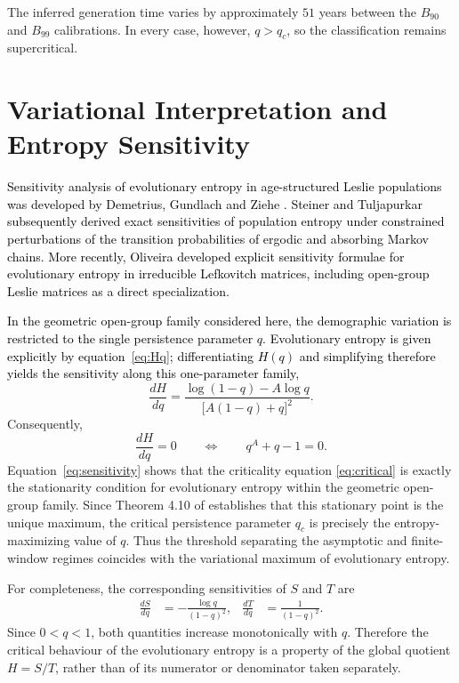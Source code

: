 \documentclass[11pt,a4paper]{amsart}
\begin{document}
The inferred generation time varies by approximately \(51\) years
between the \(B_{90}\) and \(B_{99}\) calibrations. In every case, however,
\(q>q_c\), so the classification remains supercritical.


\section{Variational Interpretation and Entropy Sensitivity}
\label{sec:sensitivity}

\textcolor{black}{Sensitivity analysis of evolutionary entropy in age-structured Leslie
populations was developed by Demetrius, Gundlach and Ziehe
\cite{Demetrius07}. Steiner and Tuljapurkar
\cite{SteinerTuljapurkar2020} subsequently derived exact sensitivities
of population entropy under constrained perturbations of the transition
probabilities of ergodic and absorbing Markov chains. More recently,
Oliveira \cite{Oliveira2026} developed explicit sensitivity
formulae for evolutionary entropy in irreducible Lefkovitch matrices,
including open-group Leslie matrices as a direct specialization.}

\textcolor{black}{In the geometric open-group family considered here, the demographic
variation is restricted to the single persistence parameter \(q\).
Evolutionary entropy is given explicitly by
equation~\eqref{eq:Hq}; differentiating \(H(q)\) and simplifying
therefore yields the sensitivity along this one-parameter family,}
\[
\frac{dH}{dq}
=
\frac{\log(1-q)-A\log q}
     {\bigl[A(1-q)+q\bigr]^2}.
\]
Consequently,
\begin{equation}
\label{eq:sensitivity}
\frac{dH}{dq}=0
\qquad\Longleftrightarrow\qquad
q^A+q-1=0.
\end{equation}
Equation~\eqref{eq:sensitivity} shows that the criticality equation
\eqref{eq:critical} is exactly the stationarity condition for
evolutionary entropy within the geometric open-group family. Since
Theorem 4.10 of \cite{BuescuElaydiOliveira2026} establishes that this
stationary point is the unique maximum, the critical persistence
parameter \(q_c\) is precisely the entropy-maximizing value of \(q\).
Thus the threshold separating the asymptotic and finite-window regimes
coincides with the variational maximum of evolutionary entropy.

For completeness, the corresponding sensitivities of $S$
and $T$ are
\[
\begin{aligned}
\frac{dS}{dq}&=-\frac{\log q}{(1-q)^2},
&
\frac{dT}{dq}&=\frac{1}{(1-q)^2}.
\end{aligned}
\]
Since $0<q<1$, both quantities increase monotonically with $q$.
Therefore the critical behaviour of the evolutionary
entropy is a property of the global quotient $H=S/T$, rather than of its numerator or denominator
taken separately.
\end{document}
